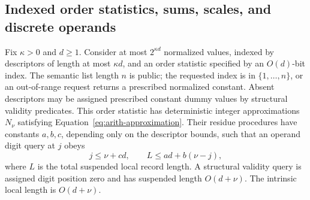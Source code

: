 \subsection{Indexed order statistics, sums, scales, and discrete operands}

\begin{lemma}
\label{lem:arith-rank}
Fix $\kappa>0$ and $d\geq1$.  Consider at most $2^{\kappa d}$
normalized values, indexed by descriptors of length at most
$\kappa d$, and an order statistic specified by an $O(d)$-bit
index.  The semantic list length $n$ is public; the requested index
is in $\{1,\ldots,n\}$, or an out-of-range request returns a
prescribed normalized constant.  Absent descriptors may be assigned
prescribed constant dummy values by structural validity predicates.
This order statistic has deterministic integer approximations $N_\nu$
satisfying Equation~\eqref{eq:arith-approximation}.  Their residue
procedures have constants $a,b,c$, depending only on the descriptor
bounds, such that an operand digit query at $j$ obeys
\begin{equation}
 j\leq \nu+cd,\qquad
 L\leq ad+b(\nu-j),
 \label{eq:arith-local-bound}
\end{equation}
where $L$ is the total suspended local record length.  A structural
validity query is assigned digit position zero and has suspended length
$O(d+\nu)$.  The intrinsic local length is $O(d+\nu)$.
\end{lemma}


